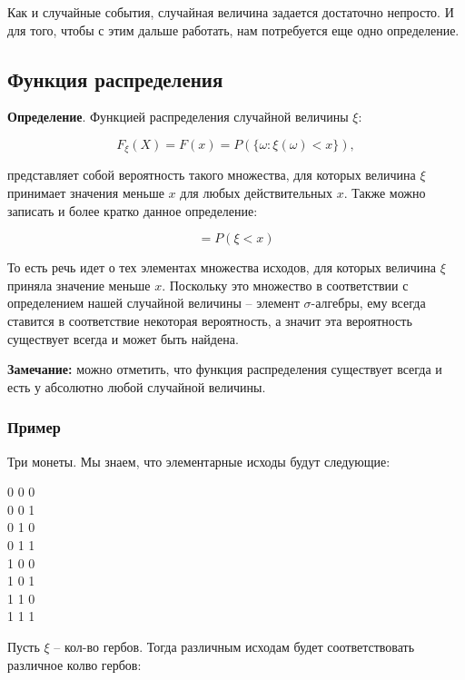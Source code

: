 \documentclass{article}
\begin{document}
Как и случайные события, случайная величина задается достаточно непросто. И для того, чтобы с этим дальше работать, нам потребуется еще одно определение.

\subsection{Функция распределения}

\textbf{Определение}. Функцией распределения случайной величины $\xi$: 

$$F_{\xi}(X) = F(x) = P(\{\omega : \xi(\omega) < x\}), $$

представляет собой вероятность такого множества, для которых величина $\xi$ принимает значения меньше $x$ для любых действительных $x$. Также можно записать и более кратко данное определение:

$$ = P(\xi < x) $$

То есть речь идет о тех элементах множества исходов, для которых величина $\xi$ приняла значение меньше $x$. Поскольку это множество в соответствии с определением нашей случайной величины -- элемент $\sigma$-алгебры, ему всегда ставится в соответствие некоторая вероятность, а значит эта вероятность существует всегда и может быть найдена.

\textbf{Замечание:} можно отметить, что функция распределения существует всегда и есть у абсолютно любой случайной величины.

\subsubsection{Пример}

Три монеты. Мы знаем, что элементарные исходы будут следующие:

\begin{center}
0 0 0\\
0 0 1\\
0 1 0\\
0 1 1\\
1 0 0\\
1 0 1\\
1 1 0\\
1 1 1
\end{center}

Пусть $\xi$ -- кол-во гербов. Тогда различным исходам будет соответствовать различное колво гербов:
\end{document}
